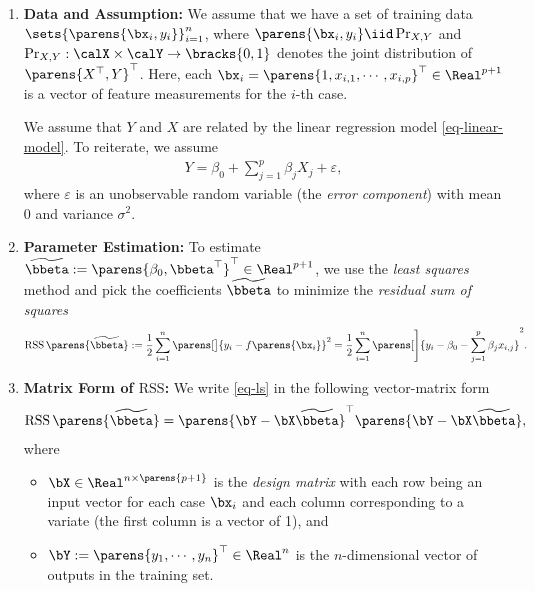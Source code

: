 \documentclass[12pt]{article}
\begin{document}
\begin{enumerate}[label=\textbf{\arabic*.}]

	\item \textbf{Data and Assumption:} We assume that we have a set of training data $\sets{\parens{\bx_i, y_i}}_{i=1}^n$, where $\parens{\bx_i, y_i} \iid \Pr_{X, Y}$ and $\Pr_{X, Y}: \calX \times \calY \to \bracks{0, 1}$ denotes the joint distribution of $\parens{X^\top, Y}^\top$. Here, each $\bx_i = \parens{1, x_{i,1}, \cdots, x_{i,p}}^\top \in \Real^{p+1}$ is a vector of feature measurements for the $i$-th case. 
	
	We assume that $Y$ and $X$ are related by the linear regression model \eqref{eq-linear-model}. To reiterate, we assume 
	\begin{align*}
		Y = \beta_0 + \sum_{j=1}^p \beta_j X_j + \varepsilon, 
	\end{align*}
	where $\varepsilon$ is an unobservable random variable (the \emph{error component}) with mean 0 and variance $\sigma^2$. 
	
	\item \textbf{Parameter Estimation:} To estimate $\widetilde{\bbeta} := \parens{\beta_0, \bbeta^\top}^\top \in \Real^{p+1}$, we use the \textit{least squares} method and pick the coefficients $\widetilde{\bbeta}$ to minimize the \textit{residual sum of squares}
	\begin{equation}\label{eq-ls}
		\mathrm{RSS} \, \parens{\widetilde{\bbeta}} := \frac{1}{2} \sum_{i=1}^n \parens[\big]{y_i - f \parens{\bx_i}}^2 = \frac{1}{2} \sum_{i=1}^n \parens[\Bigg]{y_i - \beta_0 - \sum_{j=1}^p \beta_j x_{i,j}}^2. 
	\end{equation}

	\item \textbf{Matrix Form of $\mathrm{RSS}$:} We write \eqref{eq-ls} in the following vector-matrix form 
	\begin{align*}
		\mathrm{RSS} \, \parens{\widetilde{\bbeta}} = \parens{\bY - \bX \widetilde{\bbeta}}^\top \parens{\bY - \bX \widetilde{\bbeta}}, 
	\end{align*}
	where 
	\begin{itemize}
		\item $\bX \in \Real^{n \times \parens{p+1}}$ is the \emph{design matrix} with each row being an input vector for each case $\bx_i$ and each column corresponding to a variate (the first column is a vector of 1), and 
		\item $\bY := \parens{y_1, \cdots, y_n}^\top \in \Real^{n}$ is the $n$-dimensional vector of outputs in the training set. 
	\end{itemize}
	

\end{enumerate}
\end{document}
